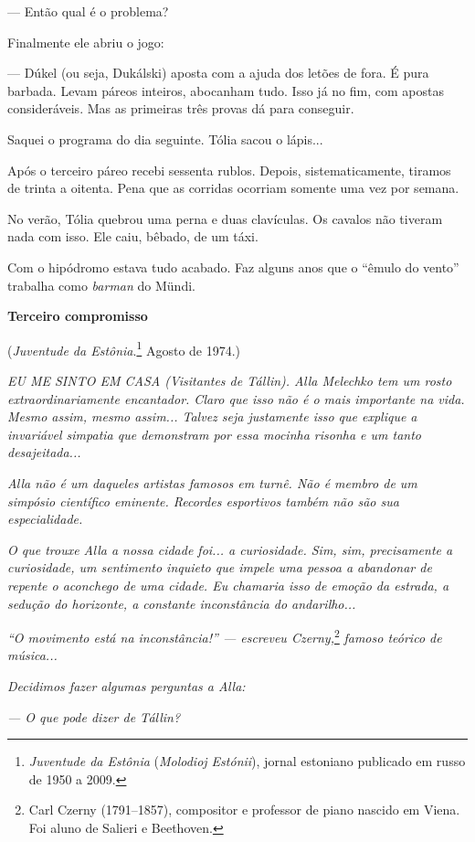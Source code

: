 --- Então qual é o problema?

Finalmente ele abriu o jogo:

--- Dúkel (ou seja, Dukálski) aposta com a ajuda dos letões de fora. É
pura barbada. Levam páreos inteiros, abocanham tudo. Isso já no fim, com
apostas consideráveis. Mas as primeiras três provas dá para conseguir.

Saquei o programa do dia seguinte. Tólia sacou o lápis...

Após o terceiro páreo recebi sessenta rublos. Depois, sistematicamente,
tiramos de trinta a oitenta. Pena que as corridas ocorriam somente uma
vez por semana.

No verão, Tólia quebrou uma perna e duas clavículas. Os cavalos não
tiveram nada com isso. Ele caiu, bêbado, de um táxi.

Com o hipódromo estava tudo acabado. Faz alguns anos que o ``êmulo do
vento'' trabalha como \emph{barman} do Mündi.

\textbf{Terceiro compromisso }

(\emph{Juventude da Estônia}.\footnote{\emph{Juventude da Estônia}
  (\emph{Molodioj Estónii}), jornal estoniano publicado em russo de 1950
  a 2009.} Agosto de 1974.)

\emph{EU ME SINTO EM CASA (Visitantes de Tállin). Alla Melechko tem um
rosto extraordinariamente encantador. Claro que isso não é o mais
importante na vida. Mesmo assim, mesmo assim... Talvez seja justamente
isso que explique a invariável simpatia que demonstram por essa mocinha
risonha e um tanto desajeitada...}

\emph{Alla não é um daqueles artistas famosos em turnê. Não é membro de
um simpósio científico eminente. Recordes esportivos também não são sua
especialidade.}

\emph{O que trouxe Alla a nossa cidade foi... a curiosidade. Sim, sim,
precisamente a curiosidade, um sentimento inquieto que impele uma pessoa
a abandonar de repente o aconchego de uma cidade. Eu chamaria isso de
emoção da estrada, a sedução do horizonte, a constante inconstância do
andarilho...}

\emph{``O movimento está na inconstância!'' --- escreveu
Czerny,}\footnote{Carl Czerny (1791--1857), compositor e professor de
  piano nascido em Viena. Foi aluno de Salieri e Beethoven.}
\emph{famoso teórico de música...}

\emph{Decidimos fazer algumas perguntas a Alla:}

\emph{--- O que pode dizer de Tállin?}

